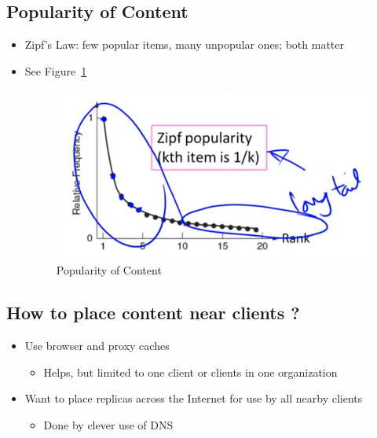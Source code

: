 \documentclass[12pt]{ctexart}   %
\begin{document}
	\subsection{Popularity of Content}
	\begin{itemize}
		\item Zipf's Law: few popular items, many unpopular ones; both matter
		\item See Figure~\ref{fig:8-7-4}
		  
		 \begin{figure}[h!] %
		\centering
		 \includegraphics[scale=0.7]{images/8-7-4}
		\caption{ Popularity of Content }
		 \label{fig:8-7-4}
		 \end{figure}
	\end{itemize}
	
	\subsection{How to place content near clients ?}
	\begin{itemize}
		\item Use browser and proxy caches
		\begin{itemize}
			\item Helps, but limited to one client or clients in one organization
		\end{itemize}
		
		\item Want to place replicas across the Internet for use by all nearby clients
		\begin{itemize}
			\item Done by clever use of DNS
		\end{itemize}
	\end{itemize}
	
\end{document}
